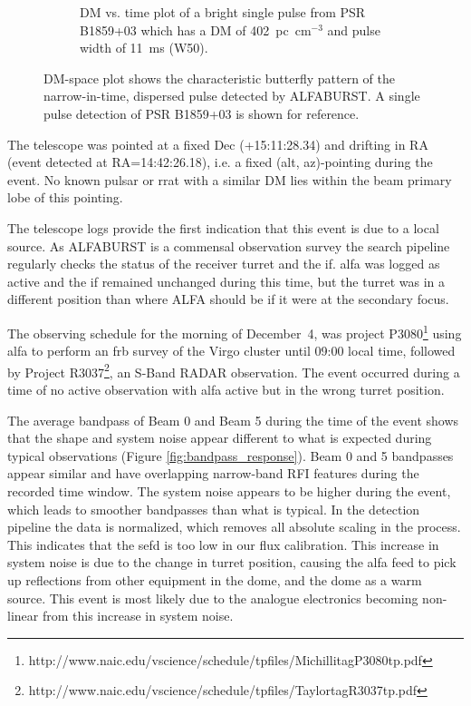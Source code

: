 \documentclass[a4paper,fleqn,usenatbib]{mnras}
\begin{document}
\begin{figure}
\begin{subfigure}[t]{0.5\textwidth}
        \caption{DM vs. time plot of a bright single pulse from PSR B1859+03 which
        has a DM of 402~pc~cm$^{-3}$ and pulse width of 11~ms (W50).
        }
        \label{fig:dm_time_B1859}
    \end{subfigure}
    \caption{DM-space plot shows the characteristic butterfly pattern of the
    narrow-in-time, dispersed pulse detected by ALFABURST. A single pulse
    detection of PSR B1859+03 is shown for reference.
    }
    \label{fig:dm_time}
\end{figure}

The telescope was pointed at a fixed Dec (+15:11:28.34) and drifting in RA
(event detected at RA=14:42:26.18), i.e. a fixed (alt, az)-pointing during the
event. No known pulsar or \gls{rrat} with a similar DM lies within the beam
primary lobe of this pointing.

The telescope logs provide the first indication that this event is due to a
local source. As ALFABURST is a commensal observation survey the search pipeline
regularly checks the status of the receiver turret and the \gls{if}. \gls{alfa} was
logged as active and the \gls{if} remained unchanged during this time, but the
turret was in a different position than where ALFA should be if it were at the
secondary focus.

The observing schedule for the morning of December~4, was project
P3080\footnote{http://www.naic.edu/vscience/schedule/tpfiles/MichillitagP3080tp.pdf}
using \gls{alfa} to perform an \gls{frb} survey of the Virgo cluster until 09:00
local time, followed by Project
R3037\footnote{http://www.naic.edu/vscience/schedule/tpfiles/TaylortagR3037tp.pdf},
an S-Band RADAR observation.  The event occurred during a time of no active
observation with \gls{alfa} active but in the wrong turret position.

The average bandpass of Beam 0 and Beam 5 during the time of the event shows
that the shape and system noise appear different to what is expected during
typical observations (Figure \ref{fig:bandpass_response}).  Beam 0 and 5
bandpasses appear similar and have overlapping narrow-band RFI features during
the recorded time window.  The system noise appears to be higher during the
event, which leads to smoother bandpasses than what is typical.  In the
detection pipeline the data is normalized, which removes all absolute scaling in
the process. This indicates that the \gls{sefd} is too low in our flux
calibration.  This increase in system noise is due to the change in turret
position, causing the \gls{alfa} feed to pick up reflections from other
equipment in the dome, and the dome as a warm source.  This event is most likely
due to the analogue electronics becoming non-linear from this increase in system
noise.
\end{document}
